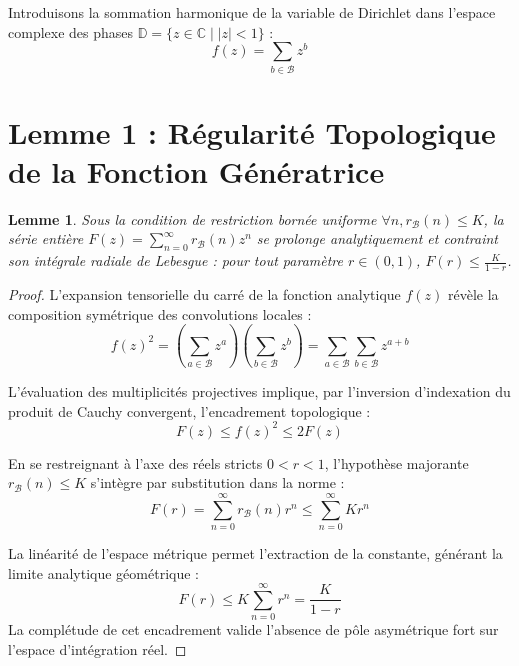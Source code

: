 \documentclass[11pt,a4paper]{article}
\newtheorem{lemma}[theorem]{Lemme}
\begin{document}
Introduisons la sommation harmonique de la variable de Dirichlet dans l'espace complexe des phases $\mathbb{D} = \{ z \in \mathbb{C} \mid |z| < 1 \}$ :
\begin{equation}
f(z) = \sum_{b \in \mathcal{B}} z^b
\end{equation}

\section{Lemme 1 : Régularité Topologique de la Fonction Génératrice}

\begin{lemma}
Sous la condition de restriction bornée uniforme $\forall n, r_{\mathcal{B}}(n) \le K$, la série entière $F(z) = \sum_{n=0}^{\infty} r_{\mathcal{B}}(n) z^n$ se prolonge analytiquement et contraint son intégrale radiale de Lebesgue : pour tout paramètre $r \in (0, 1)$, $F(r) \le \frac{K}{1-r}$.
\end{lemma}

\begin{proof}
L'expansion tensorielle du carré de la fonction analytique $f(z)$ révèle la composition symétrique des convolutions locales :
\begin{equation}
f(z)^2 = \left( \sum_{a \in \mathcal{B}} z^a \right) \left( \sum_{b \in \mathcal{B}} z^b \right) = \sum_{a \in \mathcal{B}} \sum_{b \in \mathcal{B}} z^{a+b}
\end{equation}

L'évaluation des multiplicités projectives implique, par l'inversion d'indexation du produit de Cauchy convergent, l'encadrement topologique :
\begin{equation}
F(z) \le f(z)^2 \le 2 F(z)
\end{equation}

En se restreignant à l'axe des réels stricts $0 < r < 1$, l'hypothèse majorante $r_{\mathcal{B}}(n) \le K$ s'intègre par substitution dans la norme :
\begin{equation}
F(r) = \sum_{n=0}^{\infty} r_{\mathcal{B}}(n) r^n \le \sum_{n=0}^{\infty} K r^n
\end{equation}

La linéarité de l'espace métrique permet l'extraction de la constante, générant la limite analytique géométrique :
\begin{equation}
F(r) \le K \sum_{n=0}^{\infty} r^n = \frac{K}{1 - r}
\end{equation}
La complétude de cet encadrement valide l'absence de pôle asymétrique fort sur l'espace d'intégration réel.
\end{proof}
\end{document}

